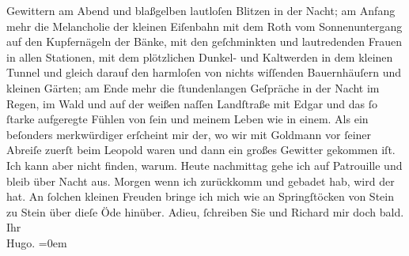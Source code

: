 \begin{ledgroupsized}[t]{13cm}
               Gewittern am Abend und blaßgelben lautloſen Blitzen in der Nacht; am Anfang mehr die
               Melancholie der kleinen Eiſenbahn mit dem Roth vom Sonnenuntergang auf den
               Kupfernägeln der Bänke, mit den geſchminkten und lautredenden {\pb}Frauen in allen Stationen, mit dem
               plötzlichen Dunkel- und Kaltwerden in dem kleinen Tunnel und gleich darauf den
               harmloſen von nichts wiſſenden Bauernhäuſern und kleinen Gärten; am Ende mehr die
               ſtundenlangen Geſpräche in der Nacht im Regen, im Wald und auf der weißen naſſen
               Landſtraße mit Edgar und das ſo ſtarke
               aufgeregte Fühlen von ſein und meinem Leben wie in einem.\pend
           \pstart
           Als ein beſonders merkwürdiger \label{K_L00464-2v}\label{K_L00464-2h} erſcheint mir der, wo wir mit Goldmann
               vor ſeiner Abreiſe zuerſt beim Leopold waren und
               dann ein großes Gewitter gekommen iſt. Ich kann aber nicht finden, warum.\pend
           \pstart
           {\pb}Heute nachmittag gehe ich auf
               Patrouille und bleib über Nacht aus. Morgen wenn ich zurückkomm und gebadet hab, wird
               der \label{K_L00464-3v}\label{K_L00464-3h} hat. An ſolchen
               kleinen Freuden bringe ich mich wie an Springſtöcken von Stein zu Stein über dieſe
               Öde hinüber.\pend
           \pstart
           Adieu, ſchreiben Sie und Richard mir doch
               bald.{\\[\baselineskip]} Ihr{\\[\baselineskip]}\spacefill\mbox{Hugo.}\pend
           \leftskip=0em{}
         
         \endnumbering{}\end{ledgroupsized}  \newcommand{\dateiname}{L00464}\newcommand{\titel}{Hugo von Hofmannsthal an Arthur Schnitzler, 17. [7. 1895]}\newcommand{\editorInnen}{Martin Anton Müller und Gerd-Hermann Susen}
      